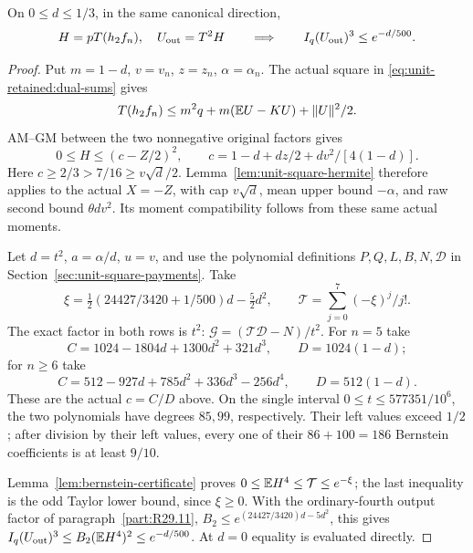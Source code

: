 \begin{proposition}
\label{prop:unit-retained:whole-L1}
On $0\le d\le1/3$, in the same canonical direction,
\[
 H=pT(h_2f_n),\quad U_{\rm out}=T^2H
 \qquad\Longrightarrow\qquad
 I_q(U_{\rm out})^3\le e^{-d/500}.
\]
\end{proposition}
\begin{proof}
Put $m=1-d$, $v=v_n$, $z=z_n$, $\alpha=\alpha_n$.
The actual square in \eqref{eq:unit-retained:dual-sums} gives
\[
 T(h_2f_n)\le m^2q+m(\mathbb E U-KU)+\|U\|^2/2.
\]
AM--GM between the two nonnegative original factors gives
\[
 0\le H\le(c-Z/2)^2,\qquad
 c=1-d+dz/2+dv^2/[4(1-d)].
\]
Here $c\ge2/3>7/16\ge v\sqrt d/2$.
Lemma~\ref{lem:unit-square-hermite}
therefore applies to the actual $X=-Z$, with cap $v\sqrt d$,
mean upper bound $-\alpha$, and raw second bound
$\theta d v^2$. Its moment compatibility follows from these same
actual moments.

Let $d=t^2$, $a=\alpha/d$, $u=v$, and use the polynomial
definitions $P,Q,L,B,N,\mathcal D$ in
Section~\ref{sec:unit-square-payments}. Take
\[
 \xi=\tfrac12(24427/3420+1/500)d-\tfrac52d^2,
 \qquad\mathcal T=\sum_{j=0}^7(-\xi)^j/j!.
\]
The exact factor in both rows is $t^2$:
$\mathcal G=(\mathcal T\mathcal D-N)/t^2$.
For $n=5$ take
\[
 C=1024-1804d+1300d^2+321d^3,\qquad D=1024(1-d);
\]
for $n\ge6$ take
\[
 C=512-927d+785d^2+336d^3-256d^4,\qquad D=512(1-d).
\]
These are the actual $c=C/D$ above. On the single interval
$0\le t\le577351/10^6$, the two polynomials have degrees
$85,99$, respectively. Their left values exceed $1/2$;
after division by their left values, every one of their
$86+100=186$ Bernstein coefficients is at least $9/10$.

Lemma~\ref{lem:bernstein-certificate} proves
$0\le\mathbb E H^4\le\mathcal T\le e^{-\xi}$; the last inequality is
the odd Taylor lower bound, since $\xi\ge0$.
With the ordinary-fourth output factor of paragraph~\ref{part:R29.11},
$B_2\le e^{(24427/3420)d-5d^2}$, this gives
$I_q(U_{\rm out})^3\le B_2(\mathbb E H^4)^2\le e^{-d/500}$.
At $d=0$ equality is evaluated directly.
\end{proof}
